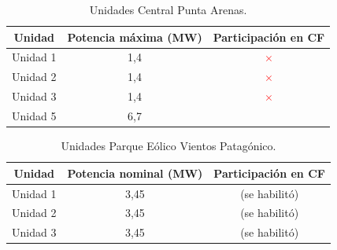 \begin{frame}{}
\footnotesize
\begin{table}[H]
	\renewcommand{\arraystretch}{1.3}
	\centering
	\caption{Unidades Central Punta Arenas.}
	\label{tab:ud_CPA}
	\begin{tabular}{|c|c|c|}
		\hline 
		Unidad & Potencia máxima (MW) & Participación en CF \\
		\hline
		Unidad 1 & 1,4 & \textcolor{red}{$\times$} \\
		Unidad 2 & 1,4 & \textcolor{red}{$\times$} \\
		Unidad 3 & 1,4 & \textcolor{red}{$\times$} \\
		Unidad 5 & 6,7 & \textcolor{green!65!black}{\checkmark} \\
		\hline
	\end{tabular}
\end{table}

\begin{table}[H]
	\renewcommand{\arraystretch}{1.3}
	\centering
	\caption{Unidades Parque Eólico Vientos Patagónico.}
	\label{tab:ud_PE_VP}
	\begin{tabular}{|c|c|c|}
		\hline Unidad & Potencia nominal (MW) & Participación en CF\\
		\hline
		Unidad 1 & 3,45 & \textcolor{green!65!black}{\textbf{\checkmark} (se habilitó)}\\
		Unidad 2 & 3,45 & \textcolor{green!65!black}{\checkmark (se habilitó)}\\
		Unidad 3 & 3,45 & \textcolor{green!65!black}{\checkmark (se habilitó)}\\
		\hline
	\end{tabular}
\end{table}
\end{frame}

